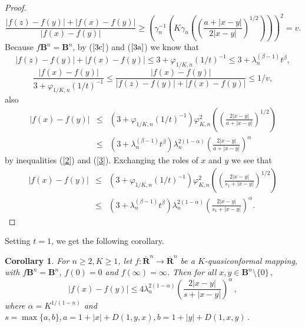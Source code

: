 \documentclass[12pt,a4paper,leqno]{amsart}
\theoremstyle{plain}
\newtheorem{corollary}[equation]{Corollary}
\numberwithin{equation}{section}          %
\begin{document}
\begin{proof}
$$\displaystyle\frac{|f(z)-f(y)|+|f(x)-f(y)|}{|f(x)-f(y)|}\geq
\displaystyle\left(\gamma_n^{-1}\left(K\gamma_n\left(\left
(\frac{a+|x-y|}{2|x-y|}\right)^{1/2}\right)\right)\right)^2=v.$$
Because $f\mathbf{B}^n=\mathbf{B}^n$, by ($\ref{3c}$) and ($\ref{3a}$) we know that
$$|f(z)-f(y)|+|f(x)-f(y)|\leq 3+\varphi_{1/K,n}(1/t)^{-1}\leq 3+\lambda_{n}^{(\beta-1)}t^\beta,$$
\begin{equation}
\frac{|f(x)-f(y)|}{3+ \varphi_{1/K,n}(1/t)^{-1}} \leq  \frac{|f(x)-f(y)|}{|f(z)-f(y)|+|f(x)-f(y)|}
                     \leq 1/v,
\end{equation}  %
also
\begin{eqnarray*}
|f(x)-f(y)|&\leq & (3+\varphi_{1/K,n}(1/t)^{-1}) \varphi_{K,n}^2\left(\left(\frac{2|x-y|}{a+|x-y|}\right)^{1/2}\right)\\
            &\leq & (3+\lambda_{n}^{(\beta-1)}t^\beta)\lambda_n^{2(1-\alpha)}\left(\frac{2|x-y|}{a+|x-y|}\right)^\alpha
\end{eqnarray*}
by inequalities (\ref{2}) and (\ref{3}). Exchanging the roles of $x$
and $y$ we see that
\begin{eqnarray*}
|f(x)-f(y)|&\leq &(3+\varphi_{1/K,n}(1/t)^{-1})
\varphi_{K,n}^2\left(\left(\frac{2|x-y|}{s_1+|x-y|}\right)^{1/2}\right)\\
          &\leq & (3+\lambda_{n}^{(\beta-1)}t^\beta)\lambda_n^{2(1-\alpha)}\left(\frac{2|x-y|}
          {s_1+|x-y|}\right)^\alpha.
\end{eqnarray*}
\end{proof}


Setting $t=1$, we get the following corollary.
\begin{corollary}\label{7} For $n\geq 2,K\geq 1$, let $f:\overline{\mathbf{R}}^n\to\overline{\mathbf{R}}^n$
be a $K$-quasiconformal mapping, with $f\mathbf{B}^n = \mathbf{B}^n$,
$f(0)=0$ and $f(\infty)=\infty$. Then for all $x,y\in \mathbf{B}^n\setminus \{0\}\,,$
$$|f(x)-f(y)|\leq 4\lambda_n^{2(1-\alpha)}\left(\frac{2|x-y|}{s+|x-y|}\right)^\alpha\,,$$
where $\alpha=K^{1/(1-n)}$ and $s=\displaystyle\max\{a,b\},
a=1+|x|+D(1,y,x), b=1+|y|+D(1,x,y)\,.$
\end{corollary}
\end{document}
